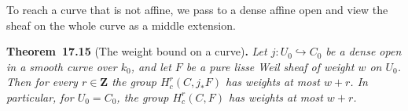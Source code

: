 \documentclass[11pt]{article}
\newenvironment{bpstatement}[2]{\par\addvspace{0.6\baselineskip}\noindent\textbf{#1}#2\textbf{.}\enspace\ignorespaces}
  {\par\addvspace{0.4\baselineskip}}
\newenvironment{bpstatementit}[2]{\begin{bpstatement}{#1}{#2}\itshape\ignorespaces}{\end{bpstatement}}
\begin{document}
\label{bp46}%
To reach a curve that is not affine, we pass to a dense affine open and view the sheaf on the whole curve as a middle extension.

\label{bp47}%
\begin{bpstatementit}{Theorem~17.15}{ (The weight bound on a curve)}
Let \(j:U_0\hookrightarrow C_0\) be a dense open in a smooth curve over \(k_0\), and let \(F\) be a pure lisse Weil sheaf of weight \(w\) on \(U_0\). Then for every \(r\in\mathbf Z\) the group \(H_c^r(C,j_*F)\) has weights at most \(w+r\). In particular, for \(U_0=C_0\), the group \(H_c^r(C,F)\) has weights at most \(w+r\).
\end{bpstatementit}
\end{document}

